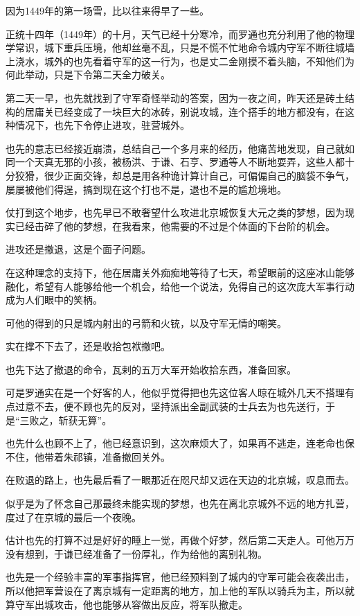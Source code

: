 \begin{multicols}{\theparacolNo}
因为1449年的第一场雪，比以往来得早了一些。

正统十四年（1449年）的十月，天气已经十分寒冷，而罗通也充分利用了他的物理学常识，城下重兵压境，他却丝毫不乱，只是不慌不忙地命令城内守军不断往城墙上浇水，城外的也先看着守军的这一行为，也是丈二金刚摸不着头脑，不知他们为何此举动，只是下令第二天全力破关。

第二天一早，也先就找到了守军奇怪举动的答案，因为一夜之间，昨天还是砖土结构的居庸关已经变成了一块巨大的冰砖，别说攻城，连个搭手的地方都没有，在这种情况下，也先下令停止进攻，驻营城外。

也先的意志已经接近崩溃，总结自己一个多月来的经历，他痛苦地发现，自己就如同一个天真无邪的小孩，被杨洪、于谦、石亨、罗通等人不断地耍弄，这些人都十分狡猾，很少正面交锋，却总是用各种诡计算计自己，可偏偏自己的脑袋不争气，屡屡被他们得逞，搞到现在这个打也不是，退也不是的尴尬境地。

仗打到这个地步，也先早已不敢奢望什么攻进北京城恢复大元之类的梦想，因为现实已经击碎了他的梦想，在我看来，他需要的不过是个体面的下台阶的机会。

进攻还是撤退，这是个面子问题。

在这种理念的支持下，他在居庸关外痴痴地等待了七天，希望眼前的这座冰山能够融化，希望有人能够给他一个机会，给他一个说法，免得自己的这次庞大军事行动成为人们眼中的笑柄。

可他的得到的只是城内射出的弓箭和火铳，以及守军无情的嘲笑。

实在撑不下去了，还是收拾包袱撤吧。

也先下达了撤退的命令，瓦剌的五万大军开始收拾东西，准备回家。

可是罗通实在是一个好客的人，他似乎觉得把也先这位客人晾在城外几天不搭理有点过意不去，便不顾也先的反对，坚持派出全副武装的士兵去为也先送行，于是“三败之，斩获无算”。

也先什么也顾不上了，他已经意识到，这次麻烦大了，如果再不逃走，连老命也保不住，他带着朱祁镇，准备撤回关外。

在败退的路上，也先最后看了一眼那近在咫尺却又远在天边的北京城，叹息而去。

似乎是为了怀念自己那最终未能实现的梦想，也先在离北京城外不远的地方扎营，度过了在京城的最后一个夜晚。

估计也先的打算不过是好好的睡上一觉，再做个好梦，然后第二天走人。可他万万没有想到，于谦已经准备了一份厚礼，作为给他的离别礼物。

也先是一个经验丰富的军事指挥官，他已经预料到了城内的守军可能会夜袭出击，所以他把军营设在了离京城有一定距离的地方，加上他的军队以骑兵为主，所以就算守军出城攻击，他也能够从容做出反应，将军队撤走。


\end{multicols}
